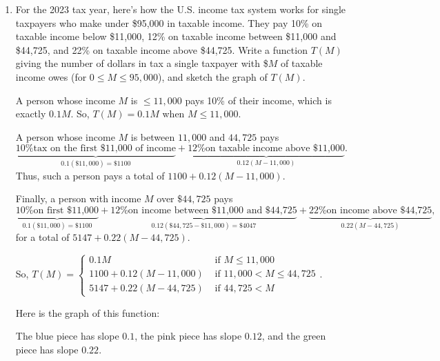 \documentclass{article}
\begin{document}
\begin{enumerate}
  \begin{enumerate}
  \item
    \begin{problem}[\stretch{1.2}]
      For the 2023 tax year, here's how the U.S. income tax system works for single taxpayers who make under \$95,000 in taxable income. They pay 10\% on taxable income below \$11,000, 12\% on taxable income between \$11,000 and \$44,725, and 22\% on taxable income above \$44,725. Write a function $T(M)$ giving the number of dollars in tax a single taxpayer with \$$M$ of taxable income owes (for $0 \leq M \leq 95,000$), and sketch the graph of $T(M)$.
    \end{problem}

    \begin{solution}
      A person whose income $M$ is $\leq 11,000$ pays 10\% of their income, which is exactly $0.1 M$. So, $T(M) = 0.1 M$ when $M \leq 11,000$.

      A person whose income $M$ is between $11,000$ and $44,725$ pays \[ \underbrace{\text{10\% tax on the first \$11,000 of income}}_{0.1 (\$11,000) = \$1100} {}+{} \underbrace{\text{12\% on taxable income above \$11,000}}_{0.12 (M - 11,000)}.\] Thus, such a person pays a total of $1100 + 0.12 (M - 11,000)$.

      Finally, a person with income $M$ over $\$44,725$ pays
      \[ \underbrace{\text{10\% on first \$11,000}}_{0.1 (\$11,000) = \$1100} {}+{} \underbrace{\text{12\% on income between \$11,000 and \$44,725}}_{0.12 (\$44,725 - \$11,000) = \$4047} {}+{} \underbrace{\text{22\% on income above \$44,725}}_{0.22 (M - 44,725)}, \] for a total of $5147 + 0.22 (M - 44,725)$.

      So, $\boxed{T(M) =
        \begin{cases}
          0.1 M & \text{ if } M \leq 11,000 \\
          1100 + 0.12 (M - 11,000) & \text{ if } 11,000 < M \leq 44,725 \\
          5147 + 0.22 (M - 44,725) & \text{ if } 44,725 < M
        \end{cases}}$.

      Here is the graph of this function:
      \begin{center}
      \end{center}
      The blue piece has slope $0.1$, the pink piece has slope $0.12$, and the green piece has slope $0.22$.
    \end{solution}


\end{enumerate}
\end{enumerate}
\end{document}
